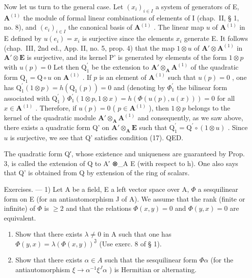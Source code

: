 Now let us turn to the general case. Let \((x_{i})_{i\in I}\) a system of generators of E, \(\mathbf{A}^{(1)}\) the module of formal linear combinations of elements of I (chap.~II, § 1, no. 8), and \((e_{i})_{i\in I}\) the canonical basis of \(\mathbf{A}^{(1)}\) . The linear map \(u\) of \(\mathbf{A}^{(1)}\) in E defined by \(u(e_{i}) = x_{i}\) is surjective since the elements \(x_{i}\) generate E. It follows (chap.~III, 2nd ed., App. II, no. 5, prop. 4) that the map \(1\otimes u\) of \(\mathbf{A}'\otimes\mathbf{A}^{(1)}\) in \(\mathbf{A}'\otimes\mathbf{E}\) is surjective, and its kernel P' is generated by elements of the form \(1\otimes p\) with \(u(p)=0\) Let then \(\mathrm{Q}_{1}^{\prime}\) be the extension to \(\mathbf{A}'\otimes_{\mathbf{A}}\mathbf{A}^{(1)}\) of the quadratic form \(\mathrm{Q}_{1}=\mathrm{Q}\circ u\) on \(\mathbf{A}^{(1)}\) . If \(p\) is an element of \(\mathbf{A}^{(1)}\) such that \(u(p)=0\) , one has \(\mathrm{Q}_{1}^{\prime}(1\otimes p)=h(\mathrm{Q}_{1}(p))=0\) and (denoting by \(\Phi_{1}^{\prime}\) the bilinear form associated with \(\mathrm{Q}_{1}^{\prime}\) ) \(\Phi_{1}^{\prime}(1\otimes p,1\otimes x)=h(\Phi(u(p),u(x)))=0\) for all \(x\in\mathbf{A}^{(1)}\) . Therefore, if \(u(p)=0\) ( \(p\in\mathbf{A}^{(1)}\) ), then \(1\otimes p\) belongs to the kernel of the quadratic module \(\mathbf{A}'\otimes_{\mathbf{A}}\mathbf{A}^{(1)}\) and consequently, as we saw above, there exists a quadratic form Q' on \(\mathbf{A}'\otimes_{\mathbf{A}}\mathbf{E}\) such that \(\mathrm{Q}_{1}^{\prime}=\mathrm{Q}^{\prime}\circ(1\otimes u)\) . Since \(u\) is surjective, we see that Q' satisfies condition (17). QED.

The quadratic form Q′, whose existence and uniqueness are guaranteed by Prop. 3, is called the extension of Q to A′ ⊗\_A E (with respect to h). One also says that Q' is obtained from Q by extension of the ring of scalars.

Exercises. --- 1) Let A be a field, E a left vector space over A, \(\Phi\) a sesquilinear form on E (for an antiautomorphism J of A). We assume that the rank (finite or infinite) of \(\Phi\) is \(\geqslant 2\) and that the relations \(\Phi(x, y) = 0\) and \(\Phi(y, x) = 0\) are equivalent.

\begin{enumerate}
\def\labelenumi{\alph{enumi})}
\item
  Show that there exists \(\lambda\neq0\) in A such that one has \(\Phi(y,x)=\lambda(\Phi(x,y))^{\mathfrak{J}}\) (Use exerc. 8 of § 1).
\item
  Show that there exists \(\alpha\in A\) such that the sesquilinear form \(\Phi\alpha\) (for the antiautomorphism \(\xi\to\alpha^{-1}\xi^{J}\alpha\) ) is Hermitian or alternating.
\end{enumerate}

